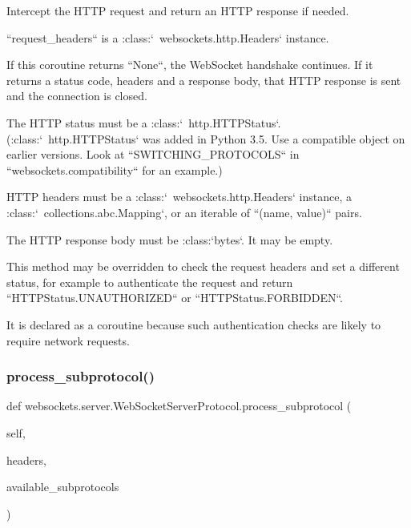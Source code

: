 \begin{DoxyVerb}Intercept the HTTP request and return an HTTP response if needed.

``request_headers`` is a :class:`~websockets.http.Headers` instance.

If this coroutine returns ``None``, the WebSocket handshake continues.
If it returns a status code, headers and a response body, that HTTP
response is sent and the connection is closed.

The HTTP status must be a :class:`~http.HTTPStatus`.
(:class:`~http.HTTPStatus` was added in Python 3.5. Use a compatible
object on earlier versions. Look at ``SWITCHING_PROTOCOLS`` in
``websockets.compatibility`` for an example.)

HTTP headers must be a :class:`~websockets.http.Headers` instance, a
:class:`~collections.abc.Mapping`, or an iterable of ``(name, value)``
pairs.

The HTTP response body must be :class:`bytes`. It may be empty.

This method may be overridden to check the request headers and set a
different status, for example to authenticate the request and return
``HTTPStatus.UNAUTHORIZED`` or ``HTTPStatus.FORBIDDEN``.

It is declared as a coroutine because such authentication checks are
likely to require network requests.\end{DoxyVerb}
 \mbox{\label{classwebsockets_1_1server_1_1_web_socket_server_protocol_ab78e73b8a5929bac69346c49039ace85}} 
\subsubsection{\texorpdfstring{process\+\_\+subprotocol()}{process\_subprotocol()}}
{\footnotesize\ttfamily def websockets.\+server.\+Web\+Socket\+Server\+Protocol.\+process\+\_\+subprotocol (\begin{DoxyParamCaption}\item[{}]{self,  }\item[{}]{headers,  }\item[{}]{available\+\_\+subprotocols }\end{DoxyParamCaption})}

